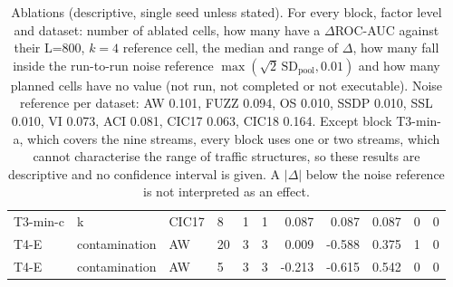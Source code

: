\begin{table}[t]
\begin{tabular}{@{}llllrrrrrrr@{}}
  T3-min-c & k & CIC17 & 8 & 1 & 1 & 0.087 & 0.087 & 0.087 & 0 & 0 \\
  T4-E & contamination & AW & 20 & 3 & 3 & 0.009 & -0.588 & 0.375 & 1 & 0 \\
  T4-E & contamination & AW & 5 & 3 & 3 & -0.213 & -0.615 & 0.542 & 0 & 0 \\
  \bottomrule
  \end{tabular}
  \caption{Ablations (descriptive, single seed unless stated). For every block, factor level and dataset: number of ablated cells, how many have a $\Delta$ROC-AUC against their L=800, $k=4$ reference cell, the median and range of $\Delta$, how many fall inside the run-to-run noise reference $\max(\sqrt{2}\,\mathrm{SD}_{\mathrm{pool}}, 0.01)$ and how many planned cells have no value (not run, not completed or not executable). Noise reference per dataset: AW 0.101, FUZZ 0.094, OS 0.010, SSDP 0.010, SSL 0.010, VI 0.073, ACI 0.081, CIC17 0.063, CIC18 0.164. Except block T3-min-a, which covers the nine streams, every block uses one or two streams, which cannot characterise the range of traffic structures, so these results are descriptive and no confidence interval is given. A $|\Delta|$ below the noise reference is not interpreted as an effect.}
  \label{tab:ablations}
\end{table}
